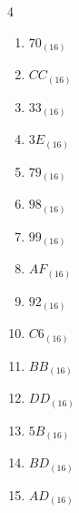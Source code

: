 \begin{multicols}{4}
\begin{enumerate}
  \item $70_{(16)}$

        \phantom{$=112$}

  \item $CC_{(16)}$

        \phantom{$=204$}

  \item $33_{(16)}$

        \phantom{$=51$}

  \item $3E_{(16)}$

        \phantom{$=62$}

  \item $79_{(16)}$

        \phantom{$=121$}

  \item $98_{(16)}$

        \phantom{$=152$}

  \item $99_{(16)}$

        \phantom{$=153$}

  \item $AF_{(16)}$

        \phantom{$=175$}

  \item $92_{(16)}$

        \phantom{$=146$}

  \item $C6_{(16)}$

        \phantom{$=198$}

  \item $BB_{(16)}$

        \phantom{$=187$}

\columnbreak %

\resetques

  \item $DD_{(16)}$

        \phantom{$=221$}

  \item $5B_{(16)}$

        \phantom{$=91$}

  \item $BD_{(16)}$

        \phantom{$=189$}

  \item $AD_{(16)}$

        \phantom{$=173$}


\end{enumerate}
\end{multicols}
